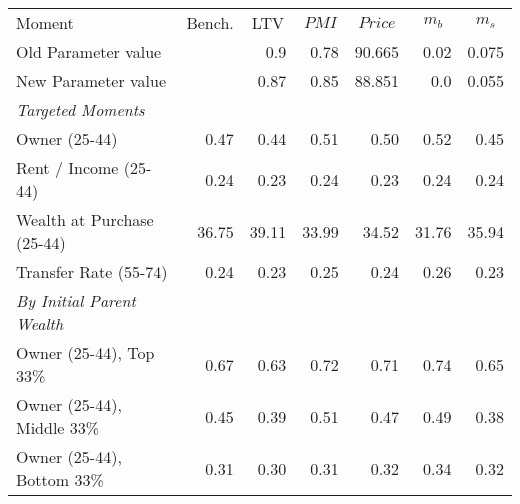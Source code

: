 \begin{tabular}{l rrrrrr}
\toprule
Moment & \multicolumn{1}{c}{Bench.} & \multicolumn{1}{c}{LTV} & \multicolumn{1}{c}{$PMI$} & \multicolumn{1}{c}{$Price$} & \multicolumn{1}{c}{$m_b$ } & \multicolumn{1}{c}{$m_s$}\\
\; Old Parameter value &  & 0.9 & 0.78 & 90.665 & 0.02 & 0.075 \\ 
\; New Parameter value &  & 0.87 & 0.85 & 88.851 & 0.0 & 0.055 \\ 
\midrule
\textit{Targeted Moments} &  &  &  &  &  & \\
\;Owner (25-44) & 0.47 & 0.44 & 0.51 & 0.50 & 0.52 & 0.45\\
\;Rent / Income (25-44) & 0.24 & 0.23 & 0.24 & 0.23 & 0.24 & 0.24\\
\;Wealth at Purchase (25-44) & 36.75 & 39.11 & 33.99 & 34.52 & 31.76 & 35.94\\
\;Transfer Rate (55-74) & 0.24 & 0.23 & 0.25 & 0.24 & 0.26 & 0.23\\
\textit{By Initial Parent Wealth} &  &  &  &  &  & \\
\;Owner (25-44), Top 33\% & 0.67 & 0.63 & 0.72 & 0.71 & 0.74 & 0.65\\
\;Owner (25-44), Middle 33\% & 0.45 & 0.39 & 0.51 & 0.47 & 0.49 & 0.38\\
\;Owner (25-44), Bottom 33\% & 0.31 & 0.30 & 0.31 & 0.32 & 0.34 & 0.32\\
\bottomrule
\end{tabular}
